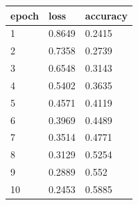 \begin{tabular}{lll}
\hline
epoch & loss & accuracy \\
\hline
1 & 0.8649 & 0.2415 \\
2 & 0.7358 & 0.2739 \\
3 & 0.6548 & 0.3143 \\
4 & 0.5402 & 0.3635 \\
5 & 0.4571 & 0.4119 \\
6 & 0.3969 & 0.4489 \\
7 & 0.3514 & 0.4771 \\
8 & 0.3129 & 0.5254 \\
9 & 0.2889 & 0.552 \\
10 & 0.2453 & 0.5885 \\
\hline
\end{tabular}
